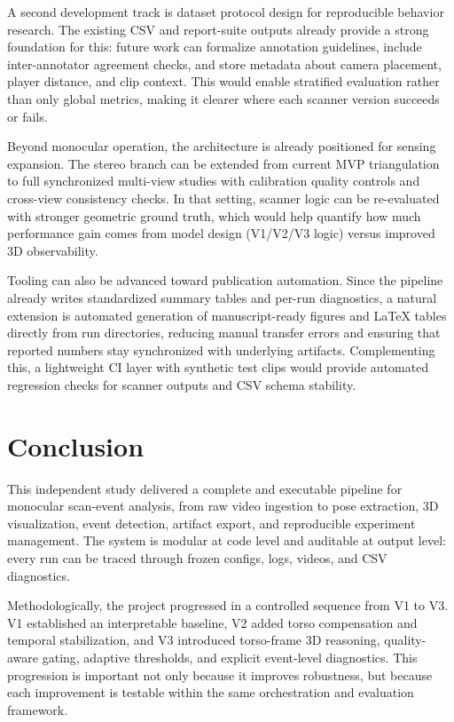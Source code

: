 \documentclass[11pt,a4paper]{article}
\begin{document}
A second development track is dataset protocol design for reproducible behavior research. The existing CSV and report-suite outputs already provide a strong foundation for this: future work can formalize annotation guidelines, include inter-annotator agreement checks, and store metadata about camera placement, player distance, and clip context. This would enable stratified evaluation rather than only global metrics, making it clearer where each scanner version succeeds or fails.

Beyond monocular operation, the architecture is already positioned for sensing expansion. The stereo branch can be extended from current MVP triangulation to full synchronized multi-view studies with calibration quality controls and cross-view consistency checks. In that setting, scanner logic can be re-evaluated with stronger geometric ground truth, which would help quantify how much performance gain comes from model design (V1/V2/V3 logic) versus improved 3D observability.

Tooling can also be advanced toward publication automation. Since the pipeline already writes standardized summary tables and per-run diagnostics, a natural extension is automated generation of manuscript-ready figures and LaTeX tables directly from run directories, reducing manual transfer errors and ensuring that reported numbers stay synchronized with underlying artifacts. Complementing this, a lightweight CI layer with synthetic test clips would provide automated regression checks for scanner outputs and CSV schema stability.

\section{Conclusion}
This independent study delivered a complete and executable pipeline for monocular scan-event analysis, from raw video ingestion to pose extraction, 3D visualization, event detection, artifact export, and reproducible experiment management. The system is modular at code level and auditable at output level: every run can be traced through frozen configs, logs, videos, and CSV diagnostics.

Methodologically, the project progressed in a controlled sequence from V1 to V3. V1 established an interpretable baseline, V2 added torso compensation and temporal stabilization, and V3 introduced torso-frame 3D reasoning, quality-aware gating, adaptive thresholds, and explicit event-level diagnostics. This progression is important not only because it improves robustness, but because each improvement is testable within the same orchestration and evaluation framework.
\end{document}
